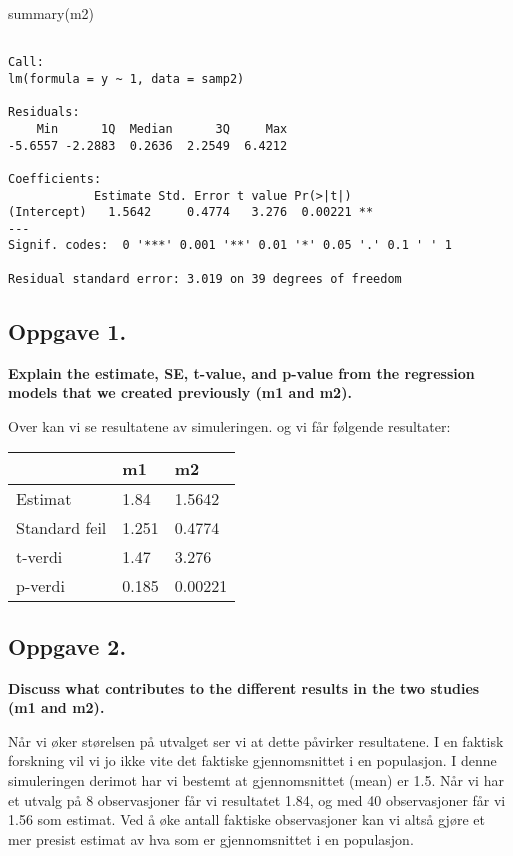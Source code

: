 \documentclass[
  letterpaper,
  DIV=11,
  numbers=noendperiod]{scrreprt}
\newenvironment{Shaded}{\begin{snugshade}}{\end{snugshade}}
\newcommand{\FunctionTok}[1]{\textcolor[rgb]{0.28,0.35,0.67}{#1}}
\newcommand{\NormalTok}[1]{\textcolor[rgb]{0.00,0.23,0.31}{#1}}
\begin{document}
\begin{Shaded}
\begin{Highlighting}[]
\FunctionTok{summary}\NormalTok{(m2)}
\end{Highlighting}
\end{Shaded}

\begin{verbatim}

Call:
lm(formula = y ~ 1, data = samp2)

Residuals:
    Min      1Q  Median      3Q     Max 
-5.6557 -2.2883  0.2636  2.2549  6.4212 

Coefficients:
            Estimate Std. Error t value Pr(>|t|)   
(Intercept)   1.5642     0.4774   3.276  0.00221 **
---
Signif. codes:  0 '***' 0.001 '**' 0.01 '*' 0.05 '.' 0.1 ' ' 1

Residual standard error: 3.019 on 39 degrees of freedom
\end{verbatim}

\subsection{Oppgave 1.}\label{oppgave-1.}

\textbf{Explain the estimate, SE, t-value, and p-value from the
regression models that we created previously (m1 and m2).}

Over kan vi se resultatene av simuleringen. og vi får følgende
resultater:

\begin{longtable}[]{@{}lll@{}}
\toprule\noalign{}
& m1 & m2 \\
\midrule\noalign{}
\endhead
\bottomrule\noalign{}
\endlastfoot
Estimat & 1.84 & 1.5642 \\
Standard feil & 1.251 & 0.4774 \\
t-verdi & 1.47 & 3.276 \\
p-verdi & 0.185 & 0.00221 \\
\end{longtable}

\subsection{Oppgave 2.}\label{oppgave-2.}

\textbf{Discuss what contributes to the different results in the two
studies (m1 and m2).}

Når vi øker størelsen på utvalget ser vi at dette påvirker resultatene.
I en faktisk forskning vil vi jo ikke vite det faktiske gjennomsnittet i
en populasjon. I denne simuleringen derimot har vi bestemt at
gjennomsnittet (mean) er 1.5. Når vi har et utvalg på 8 observasjoner
får vi resultatet 1.84, og med 40 observasjoner får vi 1.56 som estimat.
Ved å øke antall faktiske observasjoner kan vi altså gjøre et mer
presist estimat av hva som er gjennomsnittet i en populasjon.
\end{document}

